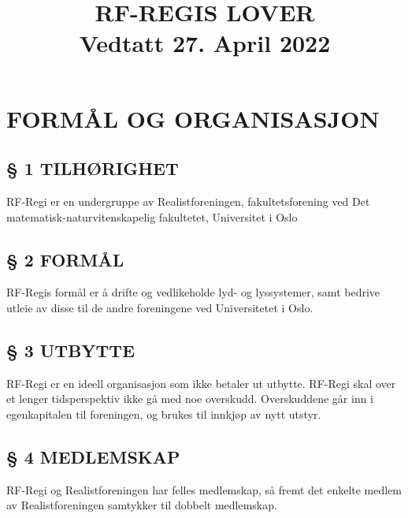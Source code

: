 \documentclass[a4paper,11pt,norsk]{scrartcl}
\providecommand*{\DUdocumentsubtitle}[1]{{\large #1}}
\providecommand*{\DUtransition}{%
  \hspace*{\fill}\hrulefill\hspace*{\fill}
  \vskip 0.5\baselineskip
}
\begin{document}
\title{RF-REGIS LOVER%
  \label{rf-regis-lover}%
  \\%
  \DUdocumentsubtitle{Vedtatt 27. April 2022}%
  \label{vedtatt-27-april-2022}}
\author{}
\date{}
\maketitle

\label{contents}
\tableofcontents

\DUtransition


\section{FORMÅL OG ORGANISASJON%
  \label{formal-og-organisasjon}%
}


\subsection{§ 1 TILHØRIGHET%
  \label{tilhorighet}%
}

RF-Regi er en undergruppe av Realistforeningen, fakultetsforening ved Det
matematisk-naturvitenskapelig fakultetet, Universitet i Oslo


\subsection{§ 2 FORMÅL%
  \label{formal}%
}

RF-Regis formål er å drifte og vedlikeholde lyd- og lyssystemer, samt
bedrive utleie av disse til de andre foreningene ved Universitetet i Oslo.


\subsection{§ 3 UTBYTTE%
  \label{utbytte}%
}

RF-Regi er en ideell organisasjon som ikke betaler ut utbytte.
RF-Regi skal over et lenger tidsperspektiv ikke gå med noe overskudd.
Overskuddene går inn i egenkapitalen til foreningen, og brukes
til innkjøp av nytt utstyr.


\subsection{§ 4 MEDLEMSKAP%
  \label{medlemskap}%
}

RF-Regi og Realistforeningen har felles medlemskap, så fremt det enkelte medlem
av Realistforeningen samtykker til dobbelt medlemskap.
\end{document}
